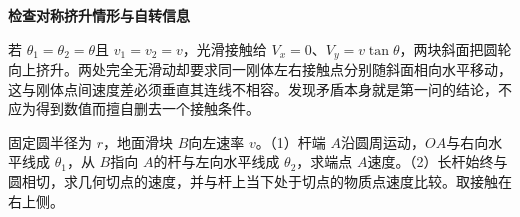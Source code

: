 \begin{solution}
\par\medskip{}\noindent\textbf{检查对称挤升情形与自转信息}\par\nobreak
若 $\theta_1=\theta_2=\theta$且 $v_1=v_2=v$，光滑接触给 $V_x=0$、$V_y=v\tan\theta$，两块斜面把圆轮向上挤升。两处完全无滑动却要求同一刚体左右接触点分别随斜面相向水平移动，这与刚体点间速度差必须垂直其连线不相容。发现矛盾本身就是第一问的结论，不应为得到数值而擅自删去一个接触条件。\end{solution}

\begin{question}\begin{example}[圆上端点与圆的切点]\label{k6p9}
固定圆半径为 $r$，地面滑块 $B$向左速率 $v$。（1）杆端 $A$沿圆周运动，$OA$与右向水平线成 $\theta_1$，从 $B$指向 $A$的杆与左向水平线成 $\theta_2$，求端点 $A$速度。（2）长杆始终与圆相切，求几何切点的速度，并与杆上当下处于切点的物质点速度比较。取接触在右上侧。\end{example}
\end{question}
